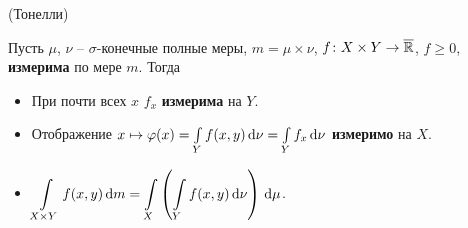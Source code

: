 \begin{theorem}(Тонелли)

    Пусть $\mu$, $\nu$ -- $\sigma$-конечные полные меры, $m = \mu \times \nu$,
    $f \colon X \times Y \to \overline{\mathbb{R}}$, $f \geqslant 0$, \textbf{измерима} по мере $m$.
    Тогда
    \begin{itemize}
        \item При почти всех $x$ $f_x$ \textbf{измерима} на $Y$.
        \item Отображение $x \mapsto \varphi(x) = \int\limits_{Y}{f(x, y) \,\mathrm{d}\nu} 
            = \int\limits_{Y}{f_x \,\mathrm{d}\nu}$ \textbf{измеримо} на $X$.
        \item $\displaystyle \int\limits_{X \times Y}{f(x, y) \,\mathrm{d} m} 
            = \int\limits_{X}{\left(\int\limits_{Y}{f(x, y) \,\mathrm{d}\nu}\right) \,\mathrm{d}\mu}$.
    \end{itemize} 
\end{theorem}
